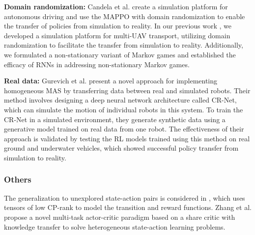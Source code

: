 \documentclass[acmsmall]{acmart}
\begin{document}
\textbf{Domain randomization: }Candela et al. \cite{9981319} create a simulation platform for autonomous driving and use the MAPPO with domain randomization to enable the transfer of policies from simulation to reality. In our previous work \cite{9993797}, we developed a simulation platform for multi-UAV transport, utilizing domain randomization to facilitate the transfer from simulation to reality. Additionally, we formulated a non-stationary variant of Markov games and established the efficacy of RNNs in addressing non-stationary Markov games.

\textbf{Real data: }Gurevich et al. \cite{gurevichreal} 
present a novel approach for implementing homogeneous MAS by transferring data between real and simulated robots. Their method involves designing a deep neural network architecture called CR-Net, which can simulate the motion of individual robots in this system. To train the CR-Net in a simulated environment, they generate synthetic data using a generative model trained on real data from one robot. The effectiveness of their approach is validated by testing the RL models trained using this method on real ground and underwater vehicles, which showed successful policy transfer from simulation to reality. %

\subsubsection{Others}
The generalization to unexplored state-action pairs is considered in \cite{van2021model}, which uses tensors of low CP-rank to model the transition and reward functions.
Zhang et al. \cite{pmlr-v157-zhang21b} propose a novel multi-task actor-critic paradigm based on a share critic with knowledge transfer to solve heterogeneous state-action learning problems.
\end{document}
